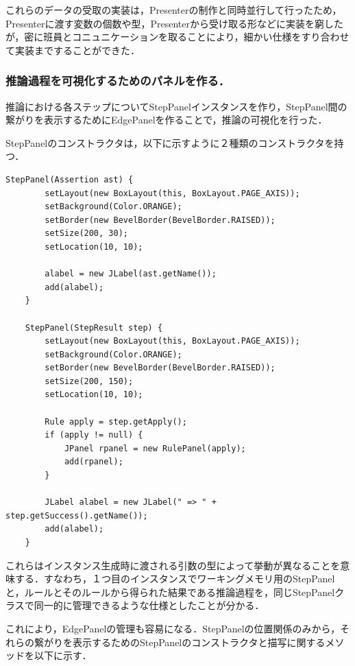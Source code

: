 \documentclass[12pt]{jarticle}
\begin{document}
これらのデータの受取の実装は，Presenterの制作と同時並行して行ったため，Presenterに渡す変数の個数や型，Presenterから受け取る形などに実装を窮したが，密に班員とコニュニケーションを取ることにより，細かい仕様をすり合わせて実装まですることができた．

\subsubsection{推論過程を可視化するためのパネルを作る．}
推論における各ステップについてStepPanelインスタンスを作り，StepPanel間の繋がりを表示するためにEdgePanelを作ることで，推論の可視化を行った．

StepPanelのコンストラクタは，以下に示すように２種類のコンストラクタを持つ．

\begin{lstlisting}[caption=StepPanelクラスのコンストラクタ２種, label=stepconst]
    StepPanel(Assertion ast) {
        setLayout(new BoxLayout(this, BoxLayout.PAGE_AXIS));
        setBackground(Color.ORANGE);
        setBorder(new BevelBorder(BevelBorder.RAISED));
        setSize(200, 30);
        setLocation(10, 10);

        alabel = new JLabel(ast.getName());
        add(alabel);
    }

    StepPanel(StepResult step) {
        setLayout(new BoxLayout(this, BoxLayout.PAGE_AXIS));
        setBackground(Color.ORANGE);
        setBorder(new BevelBorder(BevelBorder.RAISED));
        setSize(200, 150);
        setLocation(10, 10);

        Rule apply = step.getApply();
        if (apply != null) {
            JPanel rpanel = new RulePanel(apply);
            add(rpanel);
        }

        JLabel alabel = new JLabel(" => " + step.getSuccess().getName());
        add(alabel);
    }
\end{lstlisting}

これらはインスタンス生成時に渡される引数の型によって挙動が異なることを意味する．すなわち，１つ目のインスタンスでワーキングメモリ用のStepPanelと，ルールとそのルールから得られた結果である推論過程を，同じStepPanelクラスで同一的に管理できるような仕様としたことが分かる．

これにより，EdgePanelの管理も容易になる．StepPanelの位置関係のみから，それらの繋がりを表示するためのStepPanelのコンストラクタと描写に関するメソッドを以下に示す．
\end{document}
